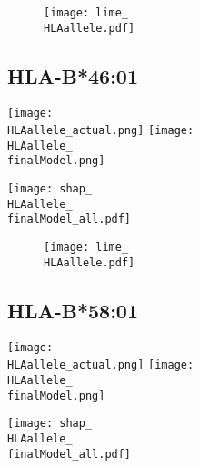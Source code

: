 \documentclass[msc,deptreport,ai]{infthesis} %
\newcommand{\finalModel}{epoch=4-step=3648186}
\newcommand{\HLAallele}{HLA-A3301}
\newcommand{\HLAalleleName}{HLA-A*33:01}
\begin{document}
				\noindent \begin{figure}[H] {\centering
						\texttt{[image: lime\_\\HLAallele.pdf]} 
						\label{fig:LIME_\HLAallele} }
				\end{figure}

		\renewcommand{\HLAallele}{HLA-B4601}
		\renewcommand{\HLAalleleName}{HLA-B*46:01}
		\subsection{\HLAalleleName}
				\noindent \begin{minipage}[c][4.2cm][t]{7cm}
					\begin{center}
					\texttt{[image: \\HLAallele\_actual.png]}
					\texttt{[image: \\HLAallele\_\\finalModel.png]} 
					\end{center}
				\end{minipage}
				\begin{minipage}[c][4.2cm][t]{7cm}
					\begin{center}
					\texttt{[image: shap\_\\HLAallele\_\\finalModel\_all.pdf]}
					\end{center}
				\end{minipage}
				
				\noindent \begin{figure}[H] {\centering
						\texttt{[image: lime\_\\HLAallele.pdf]} 
						\label{fig:LIME_\HLAallele} }
				\end{figure}

		\renewcommand{\HLAallele}{HLA-B5801}
		\renewcommand{\HLAalleleName}{HLA-B*58:01}
		\subsection{\HLAalleleName}
				\noindent \begin{minipage}[c][4.2cm][t]{7cm}
					\begin{center}
					\texttt{[image: \\HLAallele\_actual.png]}
					\texttt{[image: \\HLAallele\_\\finalModel.png]} 
					\end{center}
				\end{minipage}
				\begin{minipage}[c][4.2cm][t]{7cm}
					\begin{center}
					\texttt{[image: shap\_\\HLAallele\_\\finalModel\_all.pdf]}
					\end{center}
				\end{minipage}
				
\end{document}
